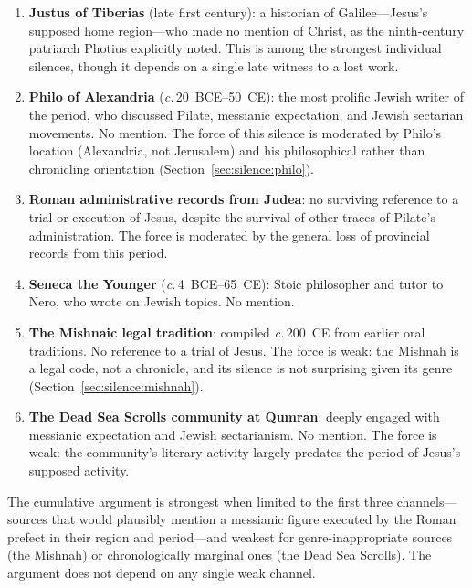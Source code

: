 \documentclass[12pt,oneside]{article}
\newcommand{\circa}{\textit{c.}\,}
\begin{document}
\begin{enumerate}[leftmargin=2em]
\item \textbf{Justus of Tiberias} (late first century): a historian
of Galilee---Jesus's supposed home region---who made no mention of
Christ, as the ninth-century patriarch Photius explicitly noted.
This is among the strongest individual silences, though it depends on
a single late witness to a lost work.

\item \textbf{Philo of Alexandria} (\circa 20~BCE--50~CE): the most
prolific Jewish writer of the period, who discussed Pilate, messianic
expectation, and Jewish sectarian movements.  No mention.  The force
of this silence is moderated by Philo's location (Alexandria, not
Jerusalem) and his philosophical rather than chronicling orientation
(Section~\ref{sec:silence:philo}).

\item \textbf{Roman administrative records from Judea}: no surviving
reference to a trial or execution of Jesus, despite the survival of
other traces of Pilate's administration.  The force is moderated by
the general loss of provincial records from this period.

\item \textbf{Seneca the Younger} (\circa 4~BCE--65~CE): Stoic
philosopher and tutor to Nero, who wrote on Jewish topics.  No
mention.

\item \textbf{The Mishnaic legal tradition}: compiled \circa 200~CE
from earlier oral traditions.  No reference to a trial of Jesus.  The
force is weak: the Mishnah is a legal code, not a chronicle, and its
silence is not surprising given its genre
(Section~\ref{sec:silence:mishnah}).

\item \textbf{The Dead Sea Scrolls community at Qumran}: deeply
engaged with messianic expectation and Jewish sectarianism.  No
mention.  The force is weak: the community's literary activity largely
predates the period of Jesus's supposed activity.
\end{enumerate}

The cumulative argument is strongest when limited to the first three
channels---sources that would plausibly mention a messianic figure
executed by the Roman prefect in their region and period---and weakest
for genre-inappropriate sources (the Mishnah) or chronologically
marginal ones (the Dead Sea Scrolls).  The argument does not depend on
any single weak channel.
\end{document}
